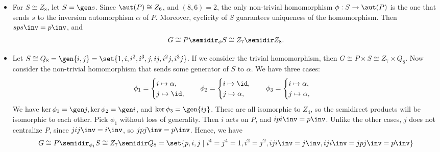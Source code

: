 \begin{solenum}[spsol]
\begin{itemize}
        It is easy to see that $P \cap \gen a = 1$, so $|P_0| = |P||\gen a| = 28$.
        Moreover, $pPp\inv = P$, and $aPa\inv = P$ since $apa\inv = p\inv$ under the action of $\phi_1$ restricted to $\gen a$.
        Hence, $P_0 \cong Z_7 \semidir Z_4$.
        It is clear that $P_0$ is normal in $G$, and $\gen b$ centralizes $P_0$, so
        \[
        	G \cong P \semidir_{\phi_1} S \cong (Z_7 \semidir Z_4) \times Z_2.
        \]
        \item For $S \cong Z_8$, let $S = \gen s$.
        Since $\aut(P) \cong Z_6$, and $(8, 6) = 2$, the only non-trivial homomorphism $\phi : S \to \aut(P)$ is the one that sends $s$ to the inversion automorphism $\alpha$ of $P$.
        Moreover, cyclicity of $S$ guarantees uniqueness of the homomorphism.
        Then $sps\inv = p\inv$, and
        \[
        	G \cong P \semidir_\phi S \cong Z_7 \semidir Z_8.
        \]
        \item Let $S \cong Q_8 = \gen{i, j} = \set{1, i, i^2, i^3, j, ij, i^2j, i^3j}$.
        If we consider the trivial homomorphism, then $G \cong P \times S \cong Z_7 \times Q_8$.
        Now consider the non-trivial homomorphism that sends some generator of $S$ to $\alpha$.
        We have three cases:
        \[
        	\phi_1 = 
            \begin{cases}
                i \mapsto \alpha, \\
                j \mapsto \id,
            \end{cases} \quad
            \phi_2 = 
            \begin{cases}
                i \mapsto \id, \\
                j \mapsto \alpha,
            \end{cases} \quad
            \phi_3 =
            \begin{cases}
                i \mapsto \alpha, \\
                j \mapsto \alpha,
            \end{cases}
        \]
        We have $\ker\phi_1 = \gen j, \ker\phi_2 = \gen i$, and $\ker\phi_3 = \gen{ij}$.
        These are all isomorphic to $Z_4$, so the semidirect products will be isomorphic to each other.
        Pick $\phi_1$ without loss of generality.
        Then $i$ acts on $P$, and $ipi\inv = p\inv$.
        Unlike the other cases, $j$ does not centralize $P$, since $jij\inv = i\inv$, so $jpj\inv = p\inv$.
        Hence, we have
        \[
        	G \cong P \semidir_{\phi_1} S \cong Z_7 \semidir Q_8 = \set{p, i, j \mid i^4 = j^4 = 1, i^2 = j^2, iji\inv = j\inv, iji\inv = jpj\inv = p\inv}
\]
\end{itemize}
\end{solenum}
